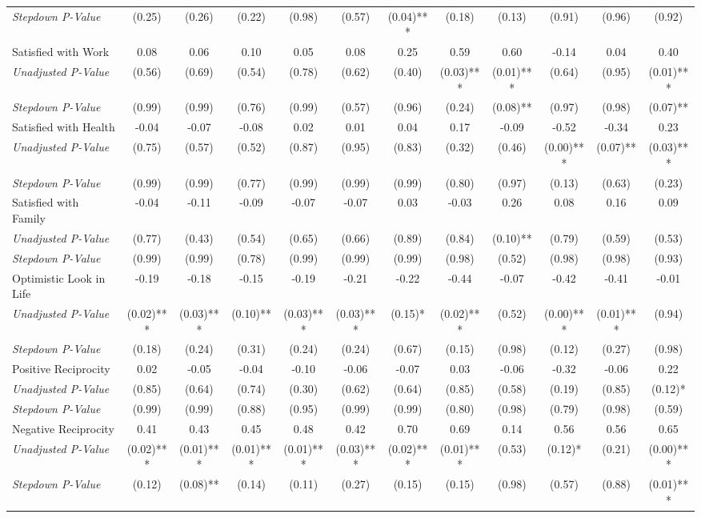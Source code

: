 \begin{tabular}{l c c c c c c c c c c c}
\quad \textit{Stepdown P-Value} & (0.25) & (0.26) & (0.22) & (0.98) & (0.57) & (0.04)*** & (0.18) & (0.13) & (0.91) & (0.96) & (0.92) \\
Satisfied with Work & 0.08 & 0.06 & 0.10 & 0.05 & 0.08 & 0.25 & 0.59 & 0.60 & -0.14 & 0.04 & 0.40 \\
\quad \textit{Unadjusted P-Value} & (0.56) & (0.69) & (0.54) & (0.78) & (0.62) & (0.40) & (0.03)*** & (0.01)*** & (0.64) & (0.95) & (0.01)*** \\
\quad \textit{Stepdown P-Value} & (0.99) & (0.99) & (0.76) & (0.99) & (0.57) & (0.96) & (0.24) & (0.08)** & (0.97) & (0.98) & (0.07)** \\
Satisfied with Health & -0.04 & -0.07 & -0.08 & 0.02 & 0.01 & 0.04 & 0.17 & -0.09 & -0.52 & -0.34 & 0.23 \\
\quad \textit{Unadjusted P-Value} & (0.75) & (0.57) & (0.52) & (0.87) & (0.95) & (0.83) & (0.32) & (0.46) & (0.00)*** & (0.07)** & (0.03)*** \\
\quad \textit{Stepdown P-Value} & (0.99) & (0.99) & (0.77) & (0.99) & (0.99) & (0.99) & (0.80) & (0.97) & (0.13) & (0.63) & (0.23) \\
Satisfied with Family & -0.04 & -0.11 & -0.09 & -0.07 & -0.07 & 0.03 & -0.03 & 0.26 & 0.08 & 0.16 & 0.09 \\
\quad \textit{Unadjusted P-Value} & (0.77) & (0.43) & (0.54) & (0.65) & (0.66) & (0.89) & (0.84) & (0.10)** & (0.79) & (0.59) & (0.53) \\
\quad \textit{Stepdown P-Value} & (0.99) & (0.99) & (0.78) & (0.99) & (0.99) & (0.99) & (0.98) & (0.52) & (0.98) & (0.98) & (0.93) \\
Optimistic Look in Life & -0.19 & -0.18 & -0.15 & -0.19 & -0.21 & -0.22 & -0.44 & -0.07 & -0.42 & -0.41 & -0.01 \\
\quad \textit{Unadjusted P-Value} & (0.02)*** & (0.03)*** & (0.10)** & (0.03)*** & (0.03)*** & (0.15)* & (0.02)*** & (0.52) & (0.00)*** & (0.01)*** & (0.94) \\
\quad \textit{Stepdown P-Value} & (0.18) & (0.24) & (0.31) & (0.24) & (0.24) & (0.67) & (0.15) & (0.98) & (0.12) & (0.27) & (0.98) \\
Positive Reciprocity & 0.02 & -0.05 & -0.04 & -0.10 & -0.06 & -0.07 & 0.03 & -0.06 & -0.32 & -0.06 & 0.22 \\
\quad \textit{Unadjusted P-Value} & (0.85) & (0.64) & (0.74) & (0.30) & (0.62) & (0.64) & (0.85) & (0.58) & (0.19) & (0.85) & (0.12)* \\
\quad \textit{Stepdown P-Value} & (0.99) & (0.99) & (0.88) & (0.95) & (0.99) & (0.99) & (0.80) & (0.98) & (0.79) & (0.98) & (0.59) \\
Negative Reciprocity & 0.41 & 0.43 & 0.45 & 0.48 & 0.42 & 0.70 & 0.69 & 0.14 & 0.56 & 0.56 & 0.65 \\
\quad \textit{Unadjusted P-Value} & (0.02)*** & (0.01)*** & (0.01)*** & (0.01)*** & (0.03)*** & (0.02)*** & (0.01)*** & (0.53) & (0.12)* & (0.21) & (0.00)*** \\
\quad \textit{Stepdown P-Value} & (0.12) & (0.08)** & (0.14) & (0.11) & (0.27) & (0.15) & (0.15) & (0.98) & (0.57) & (0.88) & (0.01)*** \\
\bottomrule
\end{tabular}
